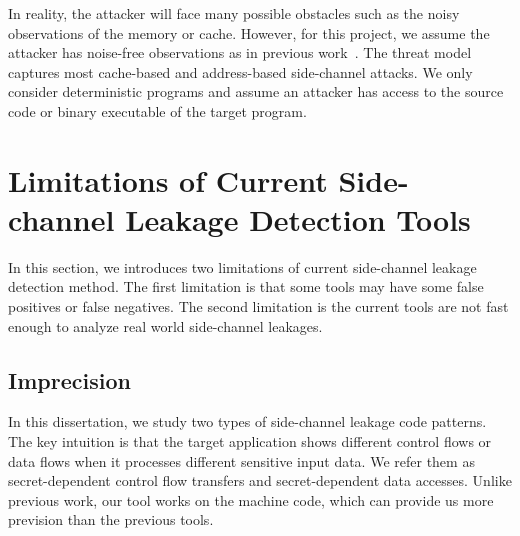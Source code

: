In reality, the
attacker will face many possible obstacles such as the noisy observations of the memory or cache. However, for this project, we assume
the attacker has noise-free observations as in previous work~\cite{203878,182946,Brotzman19Casym}.
The threat model captures most cache-based and address-based side-channel attacks.
We only consider deterministic programs and assume an attacker has access to the source code or binary executable of the target program.

\section{Limitations of Current Side-channel Leakage Detection Tools}
In this section, we introduces two limitations of current side-channel leakage detection method. The first limitation is that some tools may have some false positives or false negatives. The second limitation is the current tools are not fast enough to analyze real world side-channel leakages.


\subsection{Imprecision}
In this dissertation, we study two types of side-channel leakage code patterns. The key intuition is that the target application shows different control flows or data flows when it processes different sensitive input data. We refer them as secret-dependent control flow transfers and secret-dependent data accesses. Unlike previous work, our tool works on the machine code, which can provide us more prevision than the previous tools.
